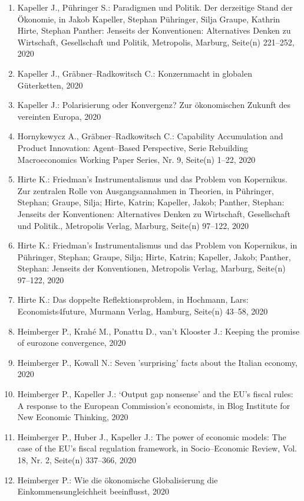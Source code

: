 \begin{enumerate}
	 \item Kapeller J., Pühringer S.: Paradigmen und Politik. Der derzeitige Stand der Ökonomie, in Jakob Kapeller, Stephan Pühringer, Silja Graupe, Kathrin Hirte, Stephan Panther: Jenseits der Konventionen: Alternatives Denken zu Wirtschaft, Gesellschaft und Politik, Metropolis, Marburg, Seite(n) 221--252, 2020
	 \item Kapeller J., Gräbner--Radkowitsch C.: Konzernmacht in globalen Güterketten, 2020
	 \item Kapeller J.: Polarisierung oder Konvergenz? Zur ökonomischen Zukunft des vereinten Europa, 2020
	 \item Hornykewycz A., Gräbner--Radkowitsch C.: Capability Accumulation and Product Innovation: Agent--Based Perspective, Serie Rebuilding Macroeconomics Working Paper Series, Nr. 9, Seite(n) 1--22, 2020
	 \item Hirte K.: Friedman’s Instrumentalismus und das Problem von Kopernikus. Zur zentralen Rolle von Ausgangsannahmen in Theorien, in Pühringer, Stephan; Graupe, Silja; Hirte, Katrin; Kapeller, Jakob; Panther, Stephan: Jenseits der Konventionen: Alternatives Denken zu Wirtschaft, Gesellschaft und Politik., Metropolis Verlag, Marburg, Seite(n) 97--122, 2020
	 \item Hirte K.: Friedman’s Instrumentalismus und das Problem von Kopernikus, in Pühringer, Stephan; Graupe, Silja; Hirte, Katrin; Kapeller, Jakob; Panther, Stephan: Jenseits der Konventionen, Metropolis Verlag, Marburg, Seite(n) 97--122, 2020
	 \item Hirte K.: Das doppelte Reflektionsproblem, in Hochmann, Lars: Economists4future, Murmann Verlag, Hamburg, Seite(n) 43--58, 2020
	 \item Heimberger P., Krahé M., Ponattu D., van't Klooster J.: Keeping the promise of eurozone convergence, 2020
	 \item Heimberger P., Kowall N.: Seven ’surprising’ facts about the Italian economy, 2020
	 \item Heimberger P., Kapeller J.: ‘Output gap nonsense’ and the EU’s fiscal rules: A response to the European Commission’s economists, in Blog Institute for New Economic Thinking, 2020
	 \item Heimberger P., Huber J., Kapeller J.: The power of economic models: The case of the EU's fiscal regulation framework, in Socio--Economic Review, Vol. 18, Nr. 2, Seite(n) 337--366, 2020
	 \item Heimberger P.: Wie die ökonomische Globalisierung die Einkommensungleichheit beeinflusst, 2020

\end{enumerate}

